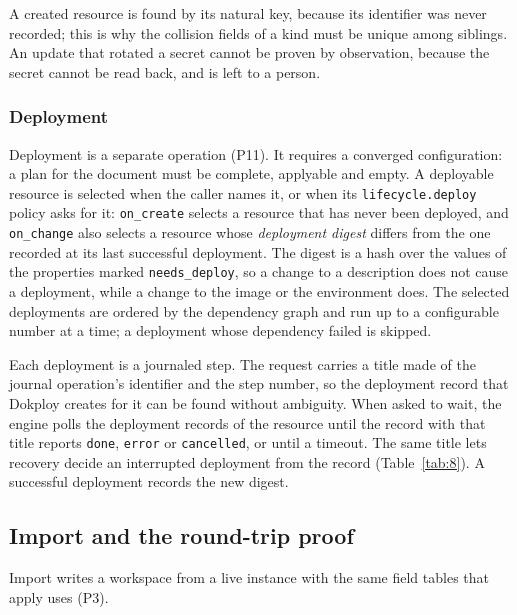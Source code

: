 A created resource is found by its natural key, because its identifier was never recorded; this is
why the collision fields of a kind must be unique among siblings. An update that rotated a secret
cannot be proven by observation, because the secret cannot be read back, and is left to a person.

\subsubsection*{Deployment}

Deployment is a separate operation (P11). It requires a converged configuration: a plan for the
document must be complete, applyable and empty. A deployable resource is selected when the caller
names it, or when its \texttt{lifecycle.deploy} policy asks for it: \texttt{on\_create} selects a resource that has
never been deployed, and \texttt{on\_change} also selects a resource whose \emph{deployment digest} differs from
the one recorded at its last successful deployment. The digest is a hash over the values of the
properties marked \texttt{needs\_deploy}, so a change to a description does not cause a deployment, while a
change to the image or the environment does. The selected deployments are ordered by the dependency
graph and run up to a configurable number at a time; a deployment whose dependency failed is skipped.

Each deployment is a journaled step. The request carries a title made of the journal operation's
identifier and the step number, so the deployment record that Dokploy creates for it can be found
without ambiguity. When asked to wait, the engine polls the deployment records of the resource until
the record with that title reports \texttt{done}, \texttt{error} or \texttt{cancelled}, or until a timeout. The same title
lets recovery decide an interrupted deployment from the record (Table~\ref{tab:8}). A successful deployment
records the new digest.

\subsection{Import and the round-trip proof}\label{sec:6.4}

Import writes a workspace from a live instance with the same field tables that apply uses (P3).

